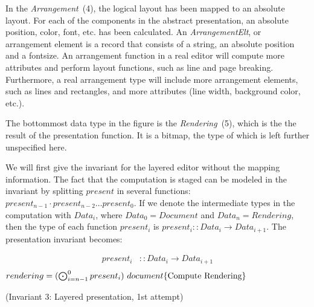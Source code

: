 In the {\em Arrangement}~(4), the logical layout has been mapped to an absolute layout. For each of the components in the abstract presentation, an absolute position, color, font, etc. has been calculated. An {\em ArrangementElt}, or arrangement element is a record that consists of a string, an absolute position and a fontsize. An arrangement function in a real editor will compute more attributes and perform layout functions, such as line and page breaking. Furthermore, a real arrangement type will include more arrangement elements, such as lines and rectangles, and more attributes (line width, background color, etc.).

The bottommost data type in the figure is the {\em Rendering}~(5), which is the the result of the presentation function. It is a bitmap, the type of which is left further unspecified here.

We will first give the invariant for the layered editor without the mapping information. The fact that the computation is staged can be modeled in the invariant by splitting $present$ in several functions: $present_{n-1} \cdot present_{n-2} \dots present_{0}$. If we denote the intermediate types in the computation with $Data_i$, where $Data_0 = Document$ and $Data_n = Rendering$, then the type of each function $present_i$ is $present_i :: Data_i \rightarrow Data_{i+1}$. The presentation invariant becomes:\begin{small}\begin{align*} %
present_i & :: Data_i \rightarrow Data_{i+1} \\
\end{align*}
\begin{math}
rendering = (\bigodot_{i=n-1}^{0} present_i)~document
\hfill \text{\{Compute Rendering\}}
\end{math}\end{small}

{\centering (Invariant 3: Layered presentation, 1st attempt)\\}\vspace{1em} 

